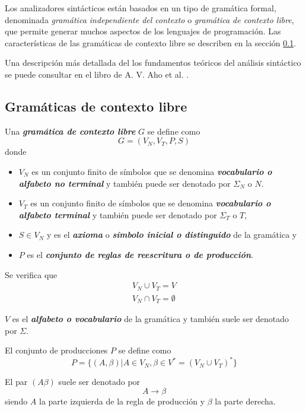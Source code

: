  Los analizadores sintácticos están basados en un tipo de gramática formal, denominada \textit{gramática independiente del contexto} o \textit{gramática de contexto libre}, que permite generar muchos aspectos de los lenguajes de programación. Las características de las gramáticas de contexto libre se describen en la sección \ref{sec:gramatica-contexto-libre}. 

 Una descripción más detallada del los fundamentos teóricos del análisis sintáctico se puede consultar en el libro de A. V. Aho et al. \cite{aho2008}.
 
 \subsection{Gramáticas de contexto libre}\label{sec:gramatica-contexto-libre}


\begin{definicion}
 Una {\bf\em gramática de contexto libre} $G$ se define como
\begin{equation}
    G = (V_N, V_T,P,S)
\end{equation}
donde
\begin{itemize}
\item $V_N$ es un conjunto finito de símbolos que se denomina {\bf\em vocabulario o alfabeto no terminal} y también puede ser denotado por $\Sigma_N$ o $N$.
\item $V_T$ es un conjunto finito de símbolos que se denomina {\bf\em  vocabulario o alfabeto terminal} y también puede ser denotado por $\Sigma_T$ o $T$,
\item $S \in V_N$ y es el {\bf\em axioma} o {\bf\em símbolo inicial o distinguido} de la gramática  y
\item $P$ es el {\bf\em conjunto de reglas de reescritura o de  producción}. 
\end{itemize}

 Se verifica que 
\begin{eqnarray}
    V_N \cup V_T = V \\
    V_N \cap V_T = \emptyset
\end{eqnarray}

 $V$ es el {\bf\em alfabeto o vocabulario} de la gramática y también suele ser denotado por $\Sigma$.

 El conjunto de producciones $P$ se define como 
\begin{equation}
  P = \{ (A, \beta) | A \in V_N, \beta \in V^* = (V_N \cup V_T)^* \}
\end{equation}

 El par $(A \beta)$ suele ser denotado por 
\begin{equation}
  A \rightarrow \beta
\end{equation}
siendo $A$ la parte izquierda de la regla de producción y $\beta$ la parte derecha.
\end{definicion}


